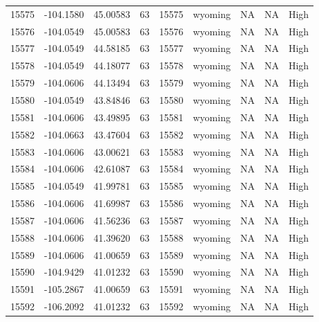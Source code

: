 \documentclass[11pt]{article}
\begin{document}
\begin{tabular}{r|llllllll}
	15575 & -104.1580 & 45.00583  & 63        & 15575     & wyoming   & NA        & NA        & High     \\
	15576 & -104.0549 & 45.00583  & 63        & 15576     & wyoming   & NA        & NA        & High     \\
	15577 & -104.0549 & 44.58185  & 63        & 15577     & wyoming   & NA        & NA        & High     \\
	15578 & -104.0549 & 44.18077  & 63        & 15578     & wyoming   & NA        & NA        & High     \\
	15579 & -104.0606 & 44.13494  & 63        & 15579     & wyoming   & NA        & NA        & High     \\
	15580 & -104.0549 & 43.84846  & 63        & 15580     & wyoming   & NA        & NA        & High     \\
	15581 & -104.0606 & 43.49895  & 63        & 15581     & wyoming   & NA        & NA        & High     \\
	15582 & -104.0663 & 43.47604  & 63        & 15582     & wyoming   & NA        & NA        & High     \\
	15583 & -104.0606 & 43.00621  & 63        & 15583     & wyoming   & NA        & NA        & High     \\
	15584 & -104.0606 & 42.61087  & 63        & 15584     & wyoming   & NA        & NA        & High     \\
	15585 & -104.0549 & 41.99781  & 63        & 15585     & wyoming   & NA        & NA        & High     \\
	15586 & -104.0606 & 41.69987  & 63        & 15586     & wyoming   & NA        & NA        & High     \\
	15587 & -104.0606 & 41.56236  & 63        & 15587     & wyoming   & NA        & NA        & High     \\
	15588 & -104.0606 & 41.39620  & 63        & 15588     & wyoming   & NA        & NA        & High     \\
	15589 & -104.0606 & 41.00659  & 63        & 15589     & wyoming   & NA        & NA        & High     \\
	15590 & -104.9429 & 41.01232  & 63        & 15590     & wyoming   & NA        & NA        & High     \\
	15591 & -105.2867 & 41.00659  & 63        & 15591     & wyoming   & NA        & NA        & High     \\
	15592 & -106.2092 & 41.01232  & 63        & 15592     & wyoming   & NA        & NA        & High     \\

\end{tabular}
\end{document}
